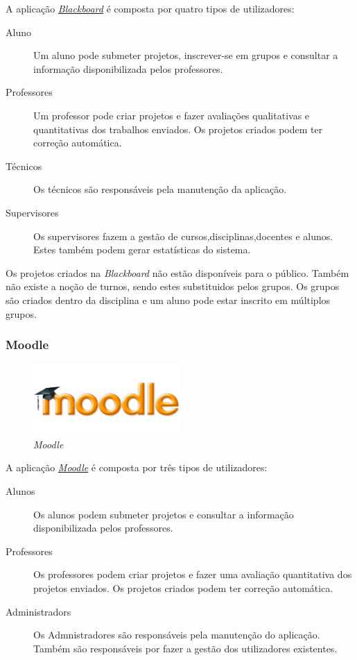 A aplicação \href{http://www.blackboard.com}{\emph{Blackboard}} é composta por quatro tipos de utilizadores:
\begin{description}
	\item[Aluno] Um aluno pode submeter projetos, inscrever-se em grupos e consultar a informação disponibilizada pelos professores.
	\item[Professores] Um professor pode criar projetos e fazer avaliações qualitativas e quantitativas dos trabalhos enviados. Os projetos criados podem ter correção automática.
	\item[Técnicos] Os técnicos são responsáveis pela manutenção da aplicação.
	\item[Supervisores] Os supervisores fazem a gestão de cursos,disciplinas,docentes e alunos. Estes também podem gerar estatísticas do sistema.
\end{description}

Os projetos criados na \emph{Blackboard} não estão disponíveis para o público. Também não existe a noção de turnos, sendo estes substituidos pelos grupos. Os grupos são criados dentro da disciplina e um aluno pode estar inscrito em múltiplos grupos.

\subsubsection{Moodle} %
\label{ssub:moodle}
\begin{figure}[H]
        \centering
        \includegraphics[width=0.5\textwidth]{images/concorrencia/moodle.jpg}
         \caption{\emph{Moodle}}
         \label{fig: moodle}
\end{figure}
A aplicação \href{http://www.moodle.org}{\emph{Moodle}} é composta por três tipos de utilizadores:

\begin{description}
	\item[Alunos] Os alunos podem submeter projetos e consultar a informação disponibilizada pelos professores.
	\item[Professores] Os professores podem criar projetos e fazer uma avaliação quantitativa dos projetos enviados. Os projetos criados podem ter correção automática.
	\item[Administradors] Os Admnistradores são responsáveis pela manutenção do aplicação. Também são responsáveis por fazer a gestão dos utilizadores existentes.
\end{description}


